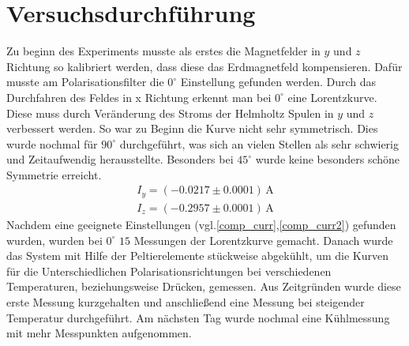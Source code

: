 \section{Versuchsdurchführung}
Zu beginn des Experiments musste als erstes die Magnetfelder in $y$ und $z$ Richtung so kalibriert werden, dass diese das Erdmagnetfeld kompensieren. Dafür musste am Polarisationsfilter die $0^\circ$ Einstellung gefunden werden. Durch das Durchfahren des Feldes in x Richtung erkennt man bei $0^\circ$ eine Lorentzkurve. Diese muss durch Veränderung des Stroms der Helmholtz Spulen in $y$ und $z$ verbessert werden. So war zu Beginn die Kurve nicht sehr symmetrisch. Dies wurde nochmal für $90^\circ$ durchgeführt, was sich an vielen Stellen als sehr schwierig und Zeitaufwendig herausstellte. Besonders bei $45^\circ$ wurde keine besonders schöne Symmetrie erreicht.
\begin{align}
	I_y=(-0.0217\pm0.0001)\,\text{A}
	\label{comp_curr}
\end{align}
\begin{align}
	I_z=(-0.2957\pm0.0001)\,\text{A}
	\label{comp_curr2}
\end{align}
Nachdem eine geeignete Einstellungen (vgl.\ref{comp_curr},\ref{comp_curr2}) gefunden wurden, wurden bei $0^\circ$ $15$ Messungen der Lorentzkurve gemacht. Danach wurde das System mit Hilfe der Peltierelemente stückweise abgekühlt, um die Kurven für die Unterschiedlichen Polarisationsrichtungen bei verschiedenen Temperaturen, beziehungsweise Drücken, gemessen. Aus Zeitgründen wurde diese erste Messung kurzgehalten und anschließend eine Messung bei steigender Temperatur durchgeführt. Am nächsten Tag wurde nochmal eine Kühlmessung mit mehr Messpunkten aufgenommen.
